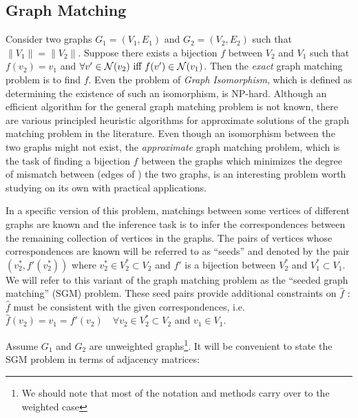 \documentclass[12pt,oneside,final]{thesis}\usepackage[]{graphicx}\usepackage[]{color}
\begin{document}
\subsection{Graph Matching}
Consider two  graphs $G_1=(V_1,E_1)$ and $G_2=(V_2,E_2)$   such that $\| V_1 \|=\| V_2 \|$. Suppose there exists a bijection $f$  between $V_2$ and $V_1$ such that $f(v_2)=v_1$ and $\forall v' \in \mathcal{N}(v_2) \textrm{ iff } f(v') \in \mathcal{N}(v_1)$. Then the \emph{exact} graph matching problem  is to find $f$. Even the problem of \emph{Graph Isomorphism}, which is defined as determining the existence  of such an isomorphism, is NP-hard.  Although an efficient algorithm  for the general  graph matching problem is not known, there are various principled heuristic algorithms for  approximate solutions of the graph matching problem  in the literature\cite{GraphMatchReview}.
Even though an isomorphism between the two graphs might not exist,  the \emph{approximate} graph matching problem, which is the task of  finding a bijection $f$ between the
graphs which minimizes the degree  of mismatch   between  (edges of ) the two graphs, is an interesting problem  worth studying on its own with practical applications\cite{GraphMatchReview,Bengoetxea2002,recentdevGraphMatching2000,VogConGraphMatchFAQ,Zaslavskiy2009}.


In a specific version of this problem, matchings between some vertices of different graphs are known  and  the  inference task is to infer the correspondences between the remaining collection of vertices in the graphs.  The pairs of vertices whose correspondences are known will be referred to as ``seeds'' and denoted by the pair $(v_2^*,f'(v_2^*)) $  where $v_2^* \in V_2^{*} \subset V_2$ and $f'$ is a bijection between  $V_2^{*}$ and $V_1^{*}\subset V_1$. We will refer to this variant of the graph matching problem as the ``seeded graph matching'' (SGM) problem. These seed pairs provide additional constraints on $\hat{f}$ : $\hat{f}$ must be consistent with the given correspondences, i.e.  $\hat{f}(v_2)=v_1=f'(v_2)\quad \forall v_2 \in V_2^{*} \subset V_2$ and $v_1 \in V_1$. 

Assume $G_1$ and $G_2$ are unweighted graphs\footnote{We should note that most of the notation and methods carry over to the weighted case}. It will be convenient to state the SGM problem in terms of adjacency matrices:
\end{document}
